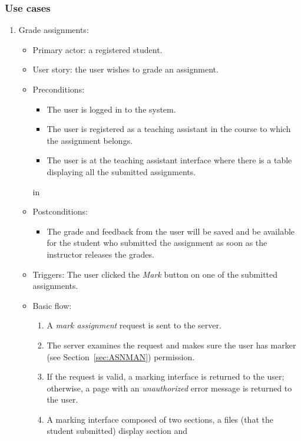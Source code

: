 \subsubsection{Use cases}
\begin{enumerate}
\item Grade assignments:
\begin{itemize}
    \item Primary actor: a registered student.
    \item User story: the user wishes to grade an assignment.
    \item Preconditions:
        \begin{itemize}
            \item The user is logged in to the system.
            \item The user is registered as a teaching assistant in the course
                to which the assignment belongs.
            \item The user is at the teaching assistant interface where there
                is a table displaying all the submitted assignments.
        \end{itemize}
     in
    \item Postconditions:
        \begin{itemize}
            \item The grade and feedback from the user will be saved and be
                available for the student who submitted the assignment as soon
                as the instructor releases the grades.
        \end{itemize}
    \item Triggers:
        The user clicked the \emph{Mark} button on one of the submitted
        assignments.
    \item Basic flow:
        \begin{enumerate}
            \item A \emph{mark assignment} request is sent to the server.
            \item The server examines the request and makes sure the user has
                marker (see Section~\ref{sec:ASNMAN}) permission.
            \item If the request is valid, a marking interface is returned to
                the user; otherwise, a page with an \emph{unauthorized} error
                message is returned to the user.
            \item A marking interface composed of two sections, 
                a files (that the student submitted) display section and

\end{enumerate}
\end{itemize}
\end{enumerate}
